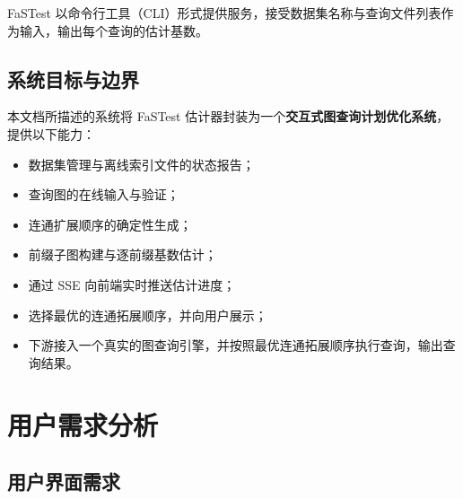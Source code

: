 \documentclass[12pt,a4paper]{article}
\begin{document}
FaSTest 以命令行工具（CLI）形式提供服务，接受数据集名称与查询文件列表作为输入，输出每个查询的估计基数。

\subsection{系统目标与边界}

本文档所描述的系统将 FaSTest 估计器封装为一个\textbf{交互式图查询计划优化系统}，
提供以下能力：
\begin{itemize}
  \item 数据集管理与离线索引文件的状态报告；
  \item 查询图的在线输入与验证；
  \item 连通扩展顺序的确定性生成；
  \item 前缀子图构建与逐前缀基数估计；
  \item 通过 SSE 向前端实时推送估计进度；
  \item 选择最优的连通拓展顺序，并向用户展示；
  \item 下游接入一个真实的图查询引擎，并按照最优连通拓展顺序执行查询，输出查询结果。
\end{itemize}


\section{用户需求分析}
\subsection{用户界面需求}
\end{document}
